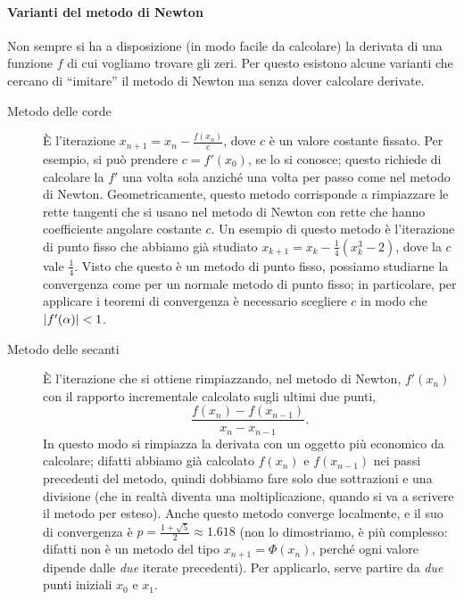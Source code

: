 \documentclass[a4paper]{report}
\DeclarePairedDelimiter{\abs}{\lvert}{\rvert}
\theoremstyle{definiton}
\theoremstyle{remark}
\begin{document}
\paragraph{Varianti del metodo di Newton} Non sempre si ha a disposizione (in modo facile da calcolare) la derivata di una funzione $f$ di cui vogliamo trovare gli zeri. Per questo esistono alcune varianti che cercano di ``imitare'' il metodo di Newton ma senza dover calcolare derivate.
\begin{description}
    \item[Metodo delle corde] È l'iterazione $x_{n+1} = x_n - \frac{f(x_n)}{c}$, dove $c$ è un valore costante fissato. Per esempio, si può prendere $c = f'(x_0)$, se lo si conosce; questo richiede di calcolare la $f'$ una volta sola anziché una volta per passo come nel metodo di Newton. Geometricamente, questo metodo corrisponde a rimpiazzare le rette tangenti che si usano nel metodo di Newton con rette che hanno coefficiente angolare costante $c$. Un esempio di questo metodo è l'iterazione di punto fisso che abbiamo già studiato $x_{k+1} = x_{k} - \frac14 (x_k^3-2)$, dove la $c$ vale $\frac14$. Visto che questo è un metodo di punto fisso, possiamo studiarne la convergenza come per un normale metodo di punto fisso; in particolare, per applicare i teoremi di convergenza è necessario scegliere $c$ in modo che $\abs{f'(\alpha)} < 1$.
    \item[Metodo delle secanti] È l'iterazione che si ottiene rimpiazzando, nel metodo di Newton, $f'(x_n)$ con il rapporto incrementale calcolato sugli ultimi due punti,
    \[
    \frac{f(x_n) - f(x_{n-1})}{x_n - x_{n-1}}.
    \]
    In questo modo si rimpiazza la derivata con un oggetto più economico da calcolare; difatti abbiamo già calcolato $f(x_n)$ e $f(x_{n-1})$ nei passi precedenti del metodo, quindi dobbiamo fare solo due sottrazioni e una divisione (che in realtà diventa una moltiplicazione, quando si va a scrivere il metodo per esteso). Anche questo metodo converge localmente, e il suo di convergenza è $p = \frac{1+\sqrt{5}}{2} \approx 1.618$ (non lo dimostriamo, è più complesso: difatti non è un metodo del tipo $x_{n+1} = \Phi(x_n)$, perché ogni valore dipende dalle \emph{due} iterate precedenti). Per applicarlo, serve partire da \emph{due} punti iniziali $x_0$ e $x_1$.
\end{description}
\end{document}
